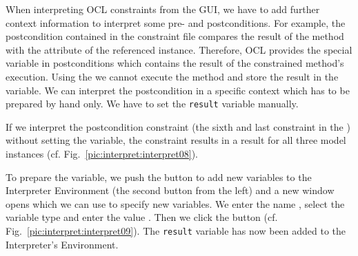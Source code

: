 When interpreting OCL constraints from the GUI, we have to add further context 
information to interpret some pre- and postconditions. For example, the 
postcondition contained in the constraint file compares the result of the 
method  with the attribute  of the referenced 
 instance. Therefore, \acs{OCL} provides the special variable 
 in postconditions which contains the result of the constrained 
method's execution. Using the  we cannot 
execute the method  and store the result in the  
variable. We can interpret the postcondition in a specific context which has to 
be prepared by hand only. We have to set the \texttt{result} variable manually.

If we interpret the postcondition constraint (the sixth and last constraint in 
the ) without setting the  variable, the 
constraint results in a  result for all three model instances
(cf. Fig.~\ref{pic:interpret:interpret08}).

To prepare the variable, we push the button to add new variables to the 
Interpreter Environment (the second button from the left) and a new window opens
which we can use to specify new variables. We enter the name , 
select the variable type  and enter the value . Then we
click the  button (cf. Fig.~\ref{pic:interpret:interpret09}). The 
\texttt{result} variable has now been added to the Interpreter's Environment.

